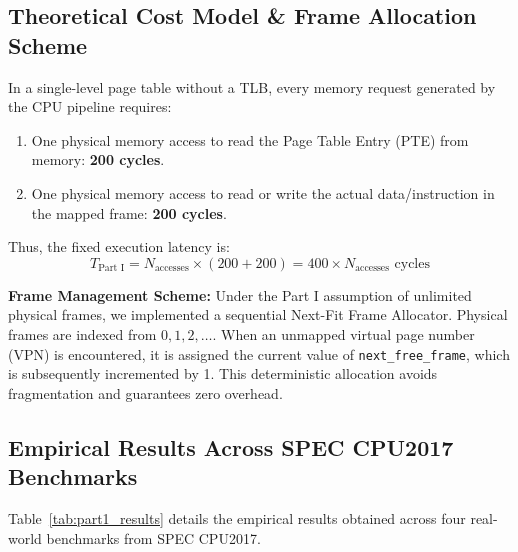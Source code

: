 \documentclass[11pt,a4paper]{article}
\begin{document}
\subsection{Theoretical Cost Model \& Frame Allocation Scheme}
In a single-level page table without a TLB, every memory request generated by the CPU pipeline requires:
\begin{enumerate}
    \item One physical memory access to read the Page Table Entry (PTE) from memory: \textbf{200 cycles}.
    \item One physical memory access to read or write the actual data/instruction in the mapped frame: \textbf{200 cycles}.
\end{enumerate}
Thus, the fixed execution latency is:
\begin{equation}
    T_{\text{Part I}} = N_{\text{accesses}} \times (200 + 200) = 400 \times N_{\text{accesses}} \text{ cycles}
\end{equation}

\noindent\textbf{Frame Management Scheme:}
Under the Part I assumption of unlimited physical frames, we implemented a sequential Next-Fit Frame Allocator. Physical frames are indexed from $0, 1, 2, \dots$. When an unmapped virtual page number (VPN) is encountered, it is assigned the current value of \texttt{next\_free\_frame}, which is subsequently incremented by 1. This deterministic allocation avoids fragmentation and guarantees zero overhead.

\subsection{Empirical Results Across SPEC CPU2017 Benchmarks}
Table~\ref{tab:part1_results} details the empirical results obtained across four real-world benchmarks from SPEC CPU2017.

\begin{table}[h]
\centering
\caption{Part I Empirical Results (Single-Level Flat Page Table)}
\label{tab:part1_results}
\end{table}
\end{document}
